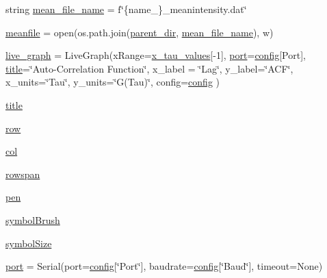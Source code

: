 \begin{DoxyCompactItemize}
\item 
string \hyperlink{namespacephoton__statistics_a86328a634773cdedebc0fd4be6a8a068}{mean\+\_\+file\+\_\+name} = f\char`\"{}\{name\+\_\+\}\+\_\+meanintensity.\+dat\char`\"{}
\item 
\hyperlink{namespacephoton__statistics_a39901f127e13a9b2adb1e3624e51cdc9}{meanfile} = open(os.\+path.\+join(\hyperlink{namespacephoton__statistics_a255f06b87745f05837e1623b921ae692}{parent\+\_\+dir}, \hyperlink{namespacephoton__statistics_a86328a634773cdedebc0fd4be6a8a068}{mean\+\_\+file\+\_\+name}), \textquotesingle{}w\textquotesingle{})
\item 
\hyperlink{namespacephoton__statistics_a75ad62bb71f891a32137fe2fd41d40d9}{live\+\_\+graph} = Live\+Graph(x\+Range=\hyperlink{namespacephoton__statistics_a930bc99eb656180a9ae6318b16d77976}{x\+\_\+tau\+\_\+values}\mbox{[}-\/1\mbox{]}, \hyperlink{namespacephoton__statistics_a09fecae480663af684a1d523466242a4}{port}=\hyperlink{namespacephoton__statistics_a4176c548148b1c86da6ddf320ab00e90}{config}\mbox{[}\textquotesingle{}Port\textquotesingle{}\mbox{]}, \hyperlink{namespacephoton__statistics_a76d9f47b30df749d7d370e77849ca649}{title}=\char`\"{}Auto-\/Correlation Function\char`\"{}, x\+\_\+label = \char`\"{}Lag\char`\"{}, y\+\_\+label=\char`\"{}A\+CF\char`\"{}, x\+\_\+units=\char`\"{}Tau\char`\"{}, y\+\_\+units=\char`\"{}G(Tau)\char`\"{}, config=\hyperlink{namespacephoton__statistics_a4176c548148b1c86da6ddf320ab00e90}{config} )
\item 
\hyperlink{namespacephoton__statistics_a76d9f47b30df749d7d370e77849ca649}{title}
\item 
\hyperlink{namespacephoton__statistics_a98d62096339004a1f6b233c2df89b3ba}{row}
\item 
\hyperlink{namespacephoton__statistics_a01b8c2da7bc3f1dd415a4c956cd2cd29}{col}
\item 
\hyperlink{namespacephoton__statistics_a01caa0fce4e95b6469fea2c15dec86b6}{rowspan}
\item 
\hyperlink{namespacephoton__statistics_a39fd907fbedfc2f81f1fdf9e6a29631a}{pen}
\item 
\hyperlink{namespacephoton__statistics_a5b8d0a21492531701eaab526f8d6ffda}{symbol\+Brush}
\item 
\hyperlink{namespacephoton__statistics_a31d8b2d681ba8e84148ca5a7a7d97829}{symbol\+Size}
\item 
\hyperlink{namespacephoton__statistics_a09fecae480663af684a1d523466242a4}{port} = Serial(port=\hyperlink{namespacephoton__statistics_a4176c548148b1c86da6ddf320ab00e90}{config}\mbox{[}\char`\"{}Port\char`\"{}\mbox{]}, baudrate=\hyperlink{namespacephoton__statistics_a4176c548148b1c86da6ddf320ab00e90}{config}\mbox{[}\char`\"{}Baud\char`\"{}\mbox{]}, timeout=None)

\end{DoxyCompactItemize}

